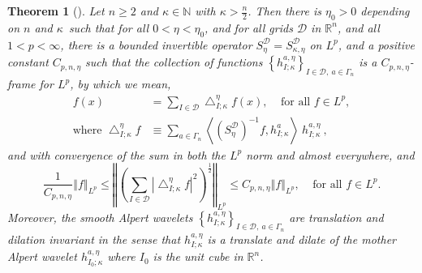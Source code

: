 \documentclass{amsart}%
\newtheorem{theorem}{Theorem}
\theoremstyle{plain}
\numberwithin{equation}{section}
\begin{document}
\begin{theorem}
[\cite{Saw7}]\label{reproducing}Let $n\geq2$ and $\kappa\in\mathbb{N}$ with
$\kappa>\frac{n}{2}$. Then there is $\eta_{0}>0$ depending on $n$ and $\kappa
$\ such that for all $0<\eta<\eta_{0}$, and for all grids $\mathcal{D}$ in
$\mathbb{R}^{n}$, and all $1<p<\infty$, there is a bounded invertible operator
$S_{\eta}^{\mathcal{D}}=S_{\kappa,\eta}^{\mathcal{D}}$ on $L^{p}$, and a
positive constant $C_{p,n,\eta}$ such that the collection of functions
$\left\{  h_{I;\kappa}^{a,\eta}\right\}  _{I\in\mathcal{D},\ a\in\Gamma_{n}}$
is a $C_{p,n,\eta}$-frame for $L^{p}$, by which we mean,%
\begin{align}
f\left(  x\right)   & =\sum_{I\in\mathcal{D}}\bigtriangleup_{I;\kappa}^{\eta
}f\left(  x\right)  ,\ \ \ \ \ \text{for all }f\in L^{p},\label{bounded below}%
\\
\text{where }\bigtriangleup_{I;\kappa}^{\eta}f  & \equiv\sum_{a\in\Gamma_{n}%
}\left\langle \left(  S_{\eta}^{\mathcal{D}}\right)  ^{-1}f,h_{I;\kappa}%
^{a}\right\rangle \ h_{I;\kappa}^{a,\eta}\ ,\nonumber
\end{align}
and with convergence of the sum in both the $L^{p}$ norm and almost
everywhere, and%
\begin{equation}
\frac{1}{C_{p,n,\eta}}\left\Vert f\right\Vert _{L^{p}}\leq\left\Vert \left(
\sum_{I\in\mathcal{D}}\left\vert \bigtriangleup_{I;\kappa}^{\eta}f\right\vert
^{2}\right)  ^{\frac{1}{2}}\right\Vert _{L^{p}}\leq C_{p,n,\eta}\left\Vert
f\right\Vert _{L^{p}},\ \ \ \ \ \text{for all }f\in L^{p}.\label{square est}%
\end{equation}
Moreover, the smooth Alpert wavelets $\left\{  h_{I;\kappa}^{a,\eta}\right\}
_{I\in\mathcal{D},\ a\in\Gamma_{n}}$ are translation and dilation invariant in
the sense that $h_{I;\kappa}^{a,\eta}$ is a translate and dilate of the mother
Alpert wavelet $h_{I_{0};\kappa}^{a,\eta}$ where $I_{0}$ is the unit cube in
$\mathbb{R}^{n}$.
\end{theorem}
\end{document}
